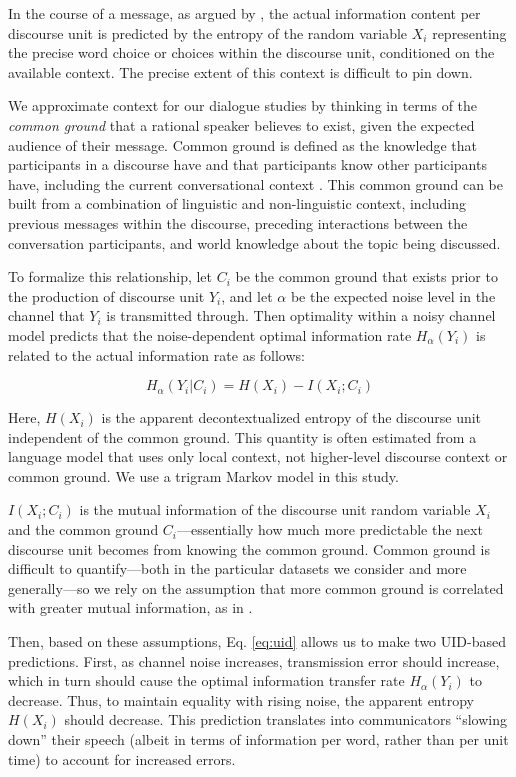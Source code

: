 \documentclass[11pt,letterpaper]{article}
\begin{document}
In the course of a message, as argued by , the actual information content per discourse unit is predicted by the entropy of the random variable $X_i$ representing the precise word choice or choices within the discourse unit, conditioned on the available context.  The precise extent of this context is difficult to pin down. 

We approximate context for our dialogue studies by thinking in terms of the {\it common ground} that a rational speaker believes to exist, given the expected audience of their message. Common ground is defined as the knowledge that participants in a discourse have and that participants know other participants have, including the current conversational context \cite{clark1996}. This common ground can be built from a combination of linguistic and non-linguistic context, including previous messages within the discourse, preceding interactions between the conversation participants, and world knowledge about the topic being discussed.

To formalize this relationship, let $C_i$ be the common ground that exists prior to the production of discourse unit $Y_i$, and let $\alpha$ be the expected noise level in the channel that $Y_i$ is transmitted through.  Then optimality within a noisy channel model predicts that the noise-dependent optimal information rate $H_{\alpha}(Y_i)$ is related to the actual information rate as follows:

\begin{equation}
H_{\alpha}(Y_i|C_i) =  H(X_i) - I(X_i ; C_i) \label{eq:uid}
\end{equation}

Here, $H(X_i)$ is the apparent decontextualized entropy of the discourse unit independent of the common ground.  This quantity is often estimated from a language model that uses only local context, not higher-level discourse context or common ground.  We use a trigram Markov model in this study.

$I(X_i;C_i)$ is the mutual information of the discourse unit random variable $X_i$ and the common ground $C_i$---essentially how much more predictable the next discourse unit becomes from knowing the common ground.  Common ground is difficult to quantify---both in the particular datasets we consider and more generally---so we rely on the assumption that more common ground is correlated with greater mutual information, as in .

Then, based on these assumptions, Eq. \ref{eq:uid} allows us to make two UID-based predictions. First, as channel noise increases, transmission error should increase, which in turn should cause the optimal information transfer rate $H_\alpha(Y_i)$ to decrease.  Thus, to maintain equality with rising noise, the apparent entropy $H(X_i)$ should decrease. This prediction translates into communicators ``slowing down'' their speech (albeit in terms of information per word, rather than per unit time) to account for increased errors. 
\end{document}
